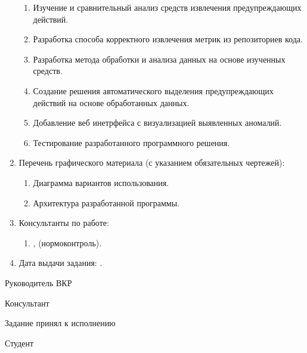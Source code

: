 \begin{enumerate}[1.]
\begin{enumerate}[label=\theenumi\arabic*.]
\item Изучение и сравнительный анализ средств извлечения предупреждающих действий.
\item Разработка способа корректного извлечения метрик из репозиториев кода.
\item Разработка метода обработки и анализа данных на основе изученных средств.
\item Создание решения автоматического выделения предупреждающих действий на основе обработанных данных.
\item Добавление веб инетрфейса с визуализацией выявленных аномалий.
\item Тестирование разработанного программного решения. 
\end{enumerate}
\item Перечень графического материала (с указанием обязательных чертежей): 
\begin{enumerate}[label=\theenumi\arabic*.]
\item Диаграмма вариантов использования.
\item Архитектура разработанной программы.
\end{enumerate}	
\item Консультанты по работе:
\begin{enumerate}[label=\theenumi\arabic*.] 
\item {\emakefirstuc{\ConsultantNormDegree}, \ConsultantNorm{} (нормоконтроль).} %
\end{enumerate}
\item Дата выдачи задания: {\thesisStartDate.}
\end{enumerate}

\intervalS%

Руководитель ВКР {\hspace*{0.1\textheight} \Supervisor}


\intervalS%

Консультант  {\hspace*{0.1\textheight}\ConsultantExtra}


\intervalS%


Задание принял к исполнению {\thesisStartDate}

\intervalS%

Студент {\hspace*{0.1\textheight}  \Author}



